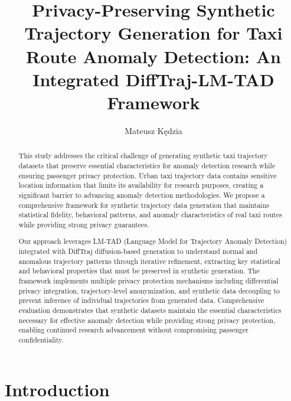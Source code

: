 \documentclass[runningheads]{llncs}
\begin{document}

\title{Privacy-Preserving Synthetic Trajectory Generation for Taxi Route Anomaly Detection: An Integrated DiffTraj-LM-TAD Framework}
\author{Mateusz K{\k e}dzia}
\maketitle

\begin{abstract}
This study addresses the critical challenge of generating synthetic taxi trajectory datasets that preserve essential characteristics for anomaly detection research while ensuring passenger privacy protection. Urban taxi trajectory data contains sensitive location information that limits its availability for research purposes, creating a significant barrier to advancing anomaly detection methodologies. We propose a comprehensive framework for synthetic trajectory data generation that maintains statistical fidelity, behavioral patterns, and anomaly characteristics of real taxi routes while providing strong privacy guarantees.

Our approach leverages LM-TAD (Language Model for Trajectory Anomaly Detection) integrated with DiffTraj diffusion-based generation to understand normal and anomalous trajectory patterns through iterative refinement, extracting key statistical and behavioral properties that must be preserved in synthetic generation. The framework implements multiple privacy protection mechanisms including differential privacy integration, trajectory-level anonymization, and synthetic data decoupling to prevent inference of individual trajectories from generated data. Comprehensive evaluation demonstrates that synthetic datasets maintain the essential characteristics necessary for effective anomaly detection while providing strong privacy protection, enabling continued research advancement without compromising passenger confidentiality.

\end{abstract}

\newpage


\section{Introduction}
\label{sec:introduction}
\end{document}
